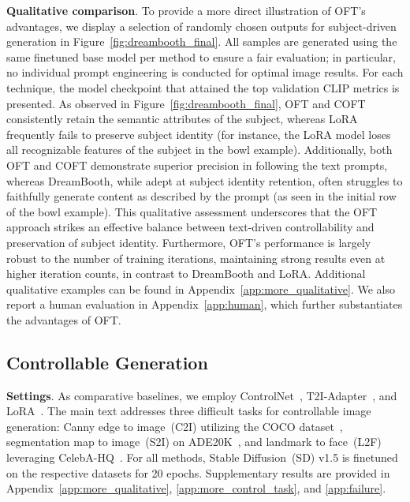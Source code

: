 {\textbf{Qualitative comparison}. To provide a more direct illustration of OFT's advantages, we display a selection of randomly chosen outputs for subject-driven generation in Figure~\ref{fig:dreambooth_final}. All samples are generated using the same finetuned base model per method to ensure a fair evaluation; in particular, no individual prompt engineering is conducted for optimal image results. For each technique, the model checkpoint that attained the top validation CLIP metrics is presented. As observed in Figure~\ref{fig:dreambooth_final}, OFT and COFT consistently retain the semantic attributes of the subject, whereas LoRA frequently fails to preserve subject identity (for instance, the LoRA model loses all recognizable features of the subject in the bowl example). Additionally, both OFT and COFT demonstrate superior precision in following the text prompts, whereas DreamBooth, while adept at subject identity retention, often struggles to faithfully generate content as described by the prompt (as seen in the initial row of the bowl example). This qualitative assessment underscores that the OFT approach strikes an effective balance between text-driven controllability and preservation of subject identity. Furthermore, OFT’s performance is largely robust to the number of training iterations, maintaining strong results even at higher iteration counts, in contrast to DreamBooth and LoRA. Additional qualitative examples can be found in Appendix~\ref{app:more_qualitative}. We also report a human evaluation in Appendix~\ref{app:human}, which further substantiates the advantages of OFT.

\subsection{Controllable Generation}

\textbf{Settings}. As comparative baselines, we employ ControlNet~\cite{zhang2023adding}, T2I-Adapter~\cite{mou2023t2i}, and LoRA~\cite{hulora2022}. The main text addresses three difficult tasks for controllable image generation: Canny edge to image~(C2I) utilizing the COCO dataset~\cite{lin2014microsoft}, segmentation map to image~(S2I) on ADE20K~\cite{zhou2017scene}, and landmark to face~(L2F) leveraging CelebA-HQ~\cite{karras2018progressive,xia2021tedigan}. For all methods, Stable Diffusion~(SD) v1.5 is finetuned on the respective datasets for 20 epochs. Supplementary results are provided in Appendix~\ref{app:more_qualitative}, \ref{app:more_control_task}, and \ref{app:failure}.

}

